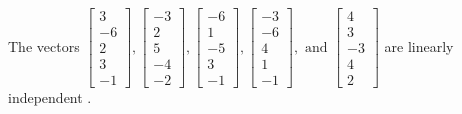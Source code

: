 \begin{exercise}
\begin{exerciseStatement}
  \end{exerciseStatement}
  \begin{exerciseAnswer}
   The vectors \(\left[\begin{array}{r}
3 \\
-6 \\
2 \\
3 \\
-1
\end{array}\right] , \left[\begin{array}{r}
-3 \\
2 \\
5 \\
-4 \\
-2
\end{array}\right] , \left[\begin{array}{r}
-6 \\
1 \\
-5 \\
3 \\
-1
\end{array}\right] , \left[\begin{array}{r}
-3 \\
-6 \\
4 \\
1 \\
-1
\end{array}\right] , \text{ and } \left[\begin{array}{r}
4 \\
3 \\
-3 \\
4 \\
2
\end{array}\right]\) are 
  	 linearly independent  .
  


  \end{exerciseAnswer}
\end{exercise}